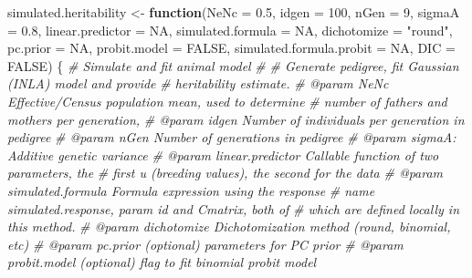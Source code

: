 \documentclass[
]{article}
\newenvironment{Shaded}{\begin{snugshade}}{\end{snugshade}}
\newcommand{\AttributeTok}[1]{\textcolor[rgb]{0.13,0.29,0.53}{#1}}
\newcommand{\CommentTok}[1]{\textcolor[rgb]{0.56,0.35,0.01}{\textit{#1}}}
\newcommand{\ConstantTok}[1]{\textcolor[rgb]{0.56,0.35,0.01}{#1}}
\newcommand{\ControlFlowTok}[1]{\textcolor[rgb]{0.13,0.29,0.53}{\textbf{#1}}}
\newcommand{\DecValTok}[1]{\textcolor[rgb]{0.00,0.00,0.81}{#1}}
\newcommand{\FloatTok}[1]{\textcolor[rgb]{0.00,0.00,0.81}{#1}}
\newcommand{\NormalTok}[1]{#1}
\newcommand{\OtherTok}[1]{\textcolor[rgb]{0.56,0.35,0.01}{#1}}
\newcommand{\StringTok}[1]{\textcolor[rgb]{0.31,0.60,0.02}{#1}}
\begin{document}
\begin{Shaded}
\begin{Highlighting}[]
\NormalTok{simulated.heritability }\OtherTok{\textless{}{-}} \ControlFlowTok{function}\NormalTok{(}\AttributeTok{NeNc =} \FloatTok{0.5}\NormalTok{, }\AttributeTok{idgen =} \DecValTok{100}\NormalTok{, }\AttributeTok{nGen =} \DecValTok{9}\NormalTok{,}
                                   \AttributeTok{sigmaA =} \FloatTok{0.8}\NormalTok{, }\AttributeTok{linear.predictor =} \ConstantTok{NA}\NormalTok{,}
                                   \AttributeTok{simulated.formula =} \ConstantTok{NA}\NormalTok{,}
                                   \AttributeTok{dichotomize =} \StringTok{"round"}\NormalTok{,}
                                   \AttributeTok{pc.prior =} \ConstantTok{NA}\NormalTok{, }\AttributeTok{probit.model =} \ConstantTok{FALSE}\NormalTok{,}
                                   \AttributeTok{simulated.formula.probit =} \ConstantTok{NA}\NormalTok{,}
                                   \AttributeTok{DIC =} \ConstantTok{FALSE}\NormalTok{) \{}
  \CommentTok{\#\textquotesingle{} Simulate and fit animal model}
  \CommentTok{\#\textquotesingle{}}
  \CommentTok{\#\textquotesingle{} Generate pedigree, fit Gaussian (INLA) model and provide}
  \CommentTok{\#\textquotesingle{} heritability estimate.}
  \CommentTok{\#\textquotesingle{} @param NeNc Effective/Census population mean, used to determine}
  \CommentTok{\#\textquotesingle{} number of fathers and mothers per generation,}
  \CommentTok{\#\textquotesingle{} @param idgen Number of individuals per generation in pedigree}
  \CommentTok{\#\textquotesingle{} @param nGen Number of generations in pedigree}
  \CommentTok{\#\textquotesingle{} @param sigmaA:  Additive genetic variance}
  \CommentTok{\#\textquotesingle{} @param linear.predictor Callable function of two parameters, the}
  \CommentTok{\#\textquotesingle{} first \textquotesingle{}u\textquotesingle{} (breeding values), the second for the data}
  \CommentTok{\#\textquotesingle{} @param simulated.formula Formula expression using the response}
  \CommentTok{\#\textquotesingle{} name \textasciigrave{}simulated.response\textasciigrave{}, param \textasciigrave{}id\textasciigrave{} and \textasciigrave{}Cmatrix\textasciigrave{}, both of}
  \CommentTok{\#\textquotesingle{} which are defined locally in this method.}
  \CommentTok{\#\textquotesingle{} @param dichotomize Dichotomization method (round, binomial, etc)}
  \CommentTok{\#\textquotesingle{} @param pc.prior (optional) parameters for PC prior}
  \CommentTok{\#\textquotesingle{} @param probit.model (optional) flag to fit binomial probit model}

\end{Highlighting}
\end{Shaded}
\end{document}
